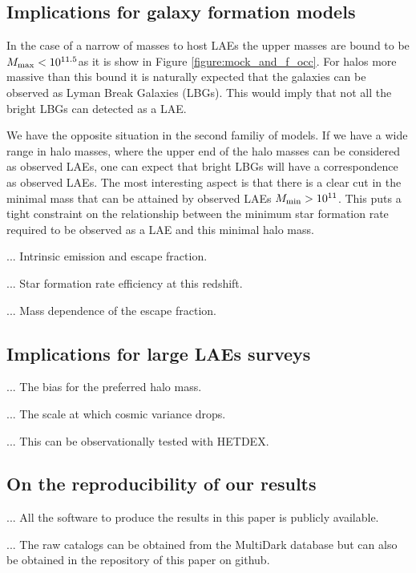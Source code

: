 \documentclass[usenatbib]{mn2e}
\newcommand{\hMsun}{{\ifmmode{h^{-1}{\rm {M_{\odot}}}}\else{$h^{-1}{\rm{M_{\odot}}}$}\fi}}
\begin{document}
\subsection{Implications for galaxy formation models}

In the case of a narrow of masses to host LAEs the upper masses are
bound to be $M_{\rm max}< 10^{11.5}$\hMsun as it is show in Figure
\ref{figure:mock_and_f_occ}. For halos more massive than this bound it
is naturally expected that the galaxies can be observed as Lyman Break
Galaxies (LBGs). This would imply that not all the bright LBGs can
detected as a LAE.

We have the opposite situation in the second familiy of models. If
we have a wide range in halo masses, where the upper end of the halo
masses can be considered as observed LAEs, one can expect that bright
LBGs will have a correspondence as observed LAEs. The most interesting
aspect is that there is a clear cut in the minimal mass that can be
attained by observed LAEs $M_{\rm min}> 10^{11}$\hMsun. This puts a tight
constraint on the relationship between the minimum star formation rate
required to be observed as a LAE and this minimal halo mass.


... Intrinsic emission and escape fraction.

... Star formation rate efficiency at this redshift.

... Mass dependence of the escape fraction.


\subsection{Implications for large LAEs surveys}

... The bias for the preferred halo mass.

... The scale at which cosmic variance drops.

... This can be observationally tested with HETDEX.

\subsection{On the reproducibility of our results}

... All the software to produce the results in this paper is publicly
available. 

... The raw catalogs can be obtained from the MultiDark database but
can also be obtained in the repository of this paper on github.
\end{document}
